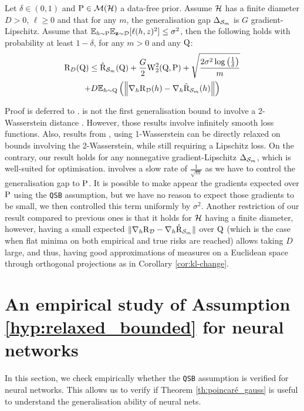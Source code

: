 \begin{theorem}
\label{th:wpb-grad}
Let $\delta\in(0,1)$ and $\P\in\Mcal(\Hcal)$ a data-free prior.
Assume $\Hcal$ has a finite diameter $D>0$, $\ell\geq 0$ and that for any $m$, the generalisation gap $\Delta_{\S_m}$ is $G$ gradient-Lipschitz.
Assume that $\mathbb{E}_{h\sim\P}\Ebb_{\z\sim\D}[\ell(h,z)^2] \leq \sigma^2$, then the following holds with probability at least $1-\delta$, for any $m>0$ and any $\Q$:
\begin{multline*}
    \Risk_D(\Q) \leq \hat{\Risk}_{\S_m}(\Q) + \frac{G}{2} \W_2^2(\Q,\P) + \sqrt{\frac{2\sigma^2\log\LP \frac{1}{\delta} \RP}{m}} \\
    + D \mathbb{E}_{h\sim \Q}\LP \left\| \nabla_h \Risk_\D(h) - \nabla_h \hat{\Risk}_{\S_m}(h) \right\| \RP
\end{multline*}
\end{theorem}
Proof is deferred to .  
 is not the first generalisation bound to involve a 2-Wasserstein distance \citep{lugosi2022generalization,lugosi2023onlinetopac}.
However, those results involve infinitely smooth loss functions.
Also, results from \citet{amit2022integral},  using 1-Wasserstein can be directly relaxed on bounds involving the 2-Wasserstein, while still requiring a Lipschitz loss.
On the contrary, our result holds for any nonnegative gradient-Lipschitz $\Delta_{\S_m}$, which is well-suited for optimisation.
 involves a slow rate of $\frac{1}{\sqrt{m}}$ as we have to control the generalisation gap \wrt to $\P$.
It is possible to make appear the gradients expected over $\P$ using the \texttt{QSB} assumption, but we have no reason to expect those gradients to be small, we then controlled this term uniformly by $\sigma^2$.
Another restriction of our result compared to previous ones is that it holds for $\H$ having a finite diameter, however, having a small expected $\| \nabla_h \Risk_\D-\nabla_h\hat{\Risk}_{\S_m}\|$ over $\Q$ (which is the case when flat minima on both empirical and true risks are reached) allows taking $D$ large, and thus, having good approximations of measures on a Euclidean space through orthogonal projections as in Corollary \ref{cor:kl-change}.

\section{An empirical study of Assumption \ref{hyp:relaxed_bounded} for neural networks}
\label{sec: expes}
In this section, we check empirically whether the \texttt{QSB} assumption is verified for neural networks.
This allows us to verify if Theorem \ref{th:poincaré_gauss} is useful to understand the generalisation ability of neural nets.\\

